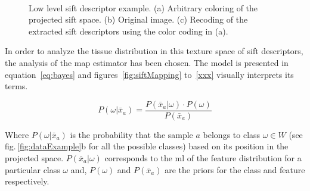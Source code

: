 \documentclass[a4paper, 10pt, conference]{llncs}      %
\begin{document}
\begin{figure}[Htbp]
\centering
{}~
\,
\caption{Low level \ac{sift} descriptor example. (a) Arbitrary coloring of the projected \acs{sift} space. (b) Original image. (c) Recoding of the extracted \ac{sift} descriptors using the color coding in (a). }
\label{fig:siftImg}
\end{figure}

In order to analyze the tissue distribution in this texture space of \ac{sift} descriptors, the analysis of the \ac{map} estimator has been chosen. The model is presented in equation~\ref{eq:bayes} and figures~\ref{fig:siftMapping} to~\ref{xxx} visually interprets its terms.

\begin{equation}
P(\omega|\bar{x}_a) = \frac{P(\bar{x}_a|\omega)\cdot P(\omega)}{P(\bar{x}_a)}
\label{eq:bayes}
\end{equation}

Where $P(\omega|\bar{x}_a)$ is the probability that the sample $a$ belongs to class $\omega \in W$ (see fig.\,\ref{fig:dataExample}b for all the possible classes) based on its position in the projected space. $P(\bar{x}_a|\omega)$ corresponds to the \ac{ml} of the feature distribution for a particular class $\omega$ and, $P(\omega)$ and $P(\bar{x}_a)$ are the priors for the class and feature respectively.
\end{document}
